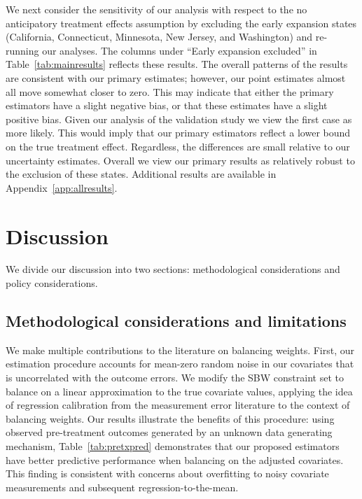 \documentclass[aoas]{imsart}
\theoremstyle{plain}
\theoremstyle{remark}
\begin{document}
We next consider the sensitivity of our analysis with respect to the no anticipatory treatment effects assumption by excluding the early expansion states (California, Connecticut, Minnesota, New Jersey, and Washington) and re-running our analyses. The columns under ``Early expansion excluded'' in Table~\ref{tab:mainresults} reflects these results. The overall patterns of the results are consistent with our primary estimates; however, our point estimates almost all move somewhat closer to zero. This may indicate that either the primary estimators have a slight negative bias, or that these estimates have a slight positive bias. Given our analysis of the validation study we view the first case as more likely. This would imply that our primary estimators reflect a lower bound on the true treatment effect. Regardless, the differences are small relative to our uncertainty estimates. Overall we view our primary results as relatively robust to the exclusion of these states. Additional results are available in Appendix~\ref{app:allresults}.

\section{Discussion}

We divide our discussion into two sections: methodological considerations and policy considerations. 

\subsection{Methodological considerations and limitations}

We make multiple contributions to the literature on balancing weights. First, our estimation procedure accounts for mean-zero random noise in our covariates that is uncorrelated with the outcome errors. We modify the SBW constraint set to balance on a linear approximation to the true covariate values, applying the idea of regression calibration from the measurement error literature to the context of balancing weights. Our results illustrate the benefits of this procedure: using observed pre-treatment outcomes generated by an unknown data generating mechanism, Table~\ref{tab:pretxpred} demonstrates that our proposed estimators have better predictive performance when balancing on the adjusted covariates. This finding is consistent with concerns about overfitting to noisy covariate measurements and subsequent regression-to-the-mean.
\end{document}
